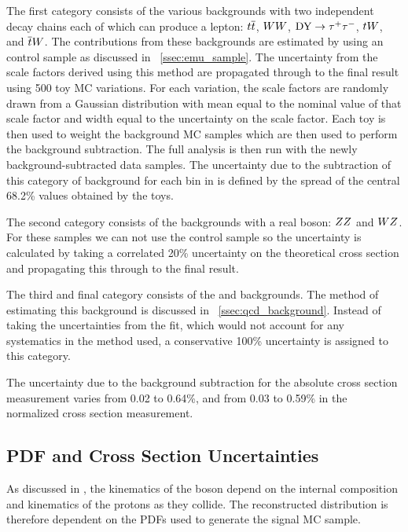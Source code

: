 The first category consists of the various backgrounds with two independent
decay chains each of which can produce a lepton: $t\overline{t}$, $WW$,
$\text{DY} \to \tau^{+} \tau^{-}$, $tW$, and $\overline{t}W$. The contributions from these backgrounds
are estimated by using an \emu control sample as discussed in
\SEC~\ref{ssec:emu_sample}. The uncertainty from the scale factors derived
using this method are propagated through to the final result using 500 toy MC
variations. For each variation, the scale factors are randomly drawn from a
Gaussian distribution with mean equal to the nominal value of that scale factor
and width equal to the uncertainty on the scale factor. Each toy is then used
to weight the background MC samples  which are then used to perform the
background subtraction. The full analysis is then run with the newly
background-subtracted data samples. The uncertainty due to the subtraction of
this category of background for each bin in \phistar is defined by the spread
of the central 68.2\% values obtained by the toys.

The second category consists of the backgrounds with a real \Z boson: $ZZ$
and $WZ$. For these samples we can not use the \emu control sample so the
uncertainty is calculated by taking a correlated 20\% uncertainty on the
theoretical cross section and propagating this through to the final result.

The third and final category consists of the \QCDjets and \wjets
backgrounds. The method of estimating this background is discussed in
\SEC~\ref{ssec:qcd_background}. Instead of taking the uncertainties from the
fit, which would not account for any systematics in the method used, a
conservative 100\% uncertainty is assigned to this category.

The uncertainty due to the background subtraction for the absolute cross
section measurement varies from 0.02 to 0.64\%, and from 0.03 to 0.59\% in the
normalized cross section measurement.

\subsection{PDF and Cross Section Uncertainties}
\label{ssec:pdf_uncertainties}

As discussed in , the kinematics of
the \Z boson depend on the internal composition and kinematics of the protons
as they collide. The reconstructed \phistar distribution is therefore dependent
on the PDFs used to generate the signal MC sample.

